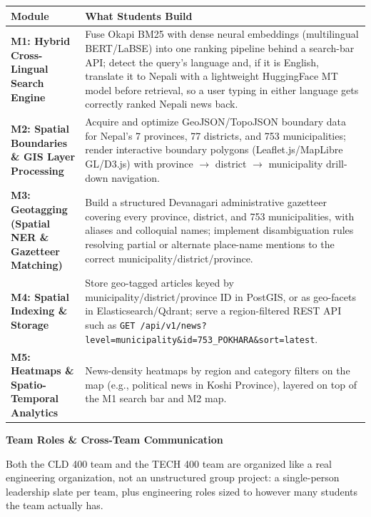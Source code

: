 \documentclass[10pt, a4paper]{article}
\newcommand{\sectionbar}[1]{%
  \par\vspace{0.7em}
  \refstepcounter{section}%
  \noindent\colorbox{secondary}{\parbox{\dimexpr\textwidth-2\fboxsep\relax}{\centering\color{white}\bfseries\Large #1}}%
  \par\vspace{0.5em}
}
\begin{document}
\begin{table}[H]
\centering
\small
\renewcommand{\arraystretch}{1.3}
\begin{tabularx}{\textwidth}{|>{\bfseries}l|X|}
\hline
\rowcolor{lightgray}
Module & What Students Build \\ \hline
M1: Hybrid Cross-Lingual Search Engine & Fuse Okapi BM25 with dense neural embeddings (multilingual BERT/LaBSE) into one ranking pipeline behind a search-bar API; detect the query's language and, if it is English, translate it to Nepali with a lightweight HuggingFace MT model before retrieval, so a user typing in either language gets correctly ranked Nepali news back. \\ \hline
M2: Spatial Boundaries \& GIS Layer Processing & Acquire and optimize GeoJSON/TopoJSON boundary data for Nepal's 7 provinces, 77 districts, and 753 municipalities; render interactive boundary polygons (Leaflet.js/MapLibre GL/D3.js) with province $\to$ district $\to$ municipality drill-down navigation. \\ \hline
M3: Geotagging (Spatial NER \& Gazetteer Matching) & Build a structured Devanagari administrative gazetteer covering every province, district, and 753 municipalities, with aliases and colloquial names; implement disambiguation rules resolving partial or alternate place-name mentions to the correct municipality/district/province. \\ \hline
M4: Spatial Indexing \& Storage & Store geo-tagged articles keyed by municipality/district/province ID in PostGIS, or as geo-facets in Elasticsearch/Qdrant; serve a region-filtered REST API such as \texttt{GET /api/v1/news?\allowbreak level=municipality\allowbreak\&id=753\_POKHARA\allowbreak\&sort=latest}. \\ \hline
M5: Heatmaps \& Spatio-Temporal Analytics & News-density heatmaps by region and category filters on the map (e.g., political news in Koshi Province), layered on top of the M1 search bar and M2 map. \\ \hline
\end{tabularx}
\end{table}

\sectionbar{Team Roles \& Cross-Team Communication}
\label{sec:roles}
Both the CLD 400 team and the TECH 400 team are organized like a real engineering organization, not an unstructured group project: a single-person leadership slate per team, plus engineering roles sized to however many students the team actually has.
\end{document}
